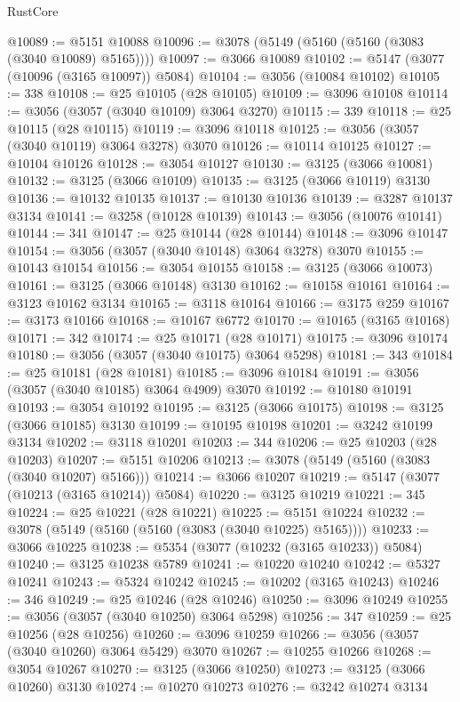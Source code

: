 \begin{lexlean}{RustCore}
\begin{coremodule}
@10089 := @5151 @10088
@10096 := @3078 (@5149 (@5160 (@5160 (@3083 (@3040 @10089) @5165))))
@10097 := @3066 @10089
@10102 := @5147 (@3077 (@10096 (@3165 @10097)) @5084)
@10104 := @3056 (@10084 @10102)
@10105 := 338
@10108 := @25 @10105 (@28 @10105)
@10109 := @3096 @10108
@10114 := @3056 (@3057 (@3040 @10109) @3064 @3270)
@10115 := 339
@10118 := @25 @10115 (@28 @10115)
@10119 := @3096 @10118
@10125 := @3056 (@3057 (@3040 @10119) @3064 @3278) @3070
@10126 := @10114 @10125
@10127 := @10104 @10126
@10128 := @3054 @10127
@10130 := @3125 (@3066 @10081)
@10132 := @3125 (@3066 @10109)
@10135 := @3125 (@3066 @10119) @3130
@10136 := @10132 @10135
@10137 := @10130 @10136
@10139 := @3287 @10137 @3134
@10141 := @3258 (@10128 @10139)
@10143 := @3056 (@10076 @10141)
@10144 := 341
@10147 := @25 @10144 (@28 @10144)
@10148 := @3096 @10147
@10154 := @3056 (@3057 (@3040 @10148) @3064 @3278) @3070
@10155 := @10143 @10154
@10156 := @3054 @10155
@10158 := @3125 (@3066 @10073)
@10161 := @3125 (@3066 @10148) @3130
@10162 := @10158 @10161
@10164 := @3123 @10162 @3134
@10165 := @3118 @10164
@10166 := @3175 @259
@10167 := @3173 @10166
@10168 := @10167 @6772
@10170 := @10165 (@3165 @10168)
@10171 := 342
@10174 := @25 @10171 (@28 @10171)
@10175 := @3096 @10174
@10180 := @3056 (@3057 (@3040 @10175) @3064 @5298)
@10181 := 343
@10184 := @25 @10181 (@28 @10181)
@10185 := @3096 @10184
@10191 := @3056 (@3057 (@3040 @10185) @3064 @4909) @3070
@10192 := @10180 @10191
@10193 := @3054 @10192
@10195 := @3125 (@3066 @10175)
@10198 := @3125 (@3066 @10185) @3130
@10199 := @10195 @10198
@10201 := @3242 @10199 @3134
@10202 := @3118 @10201
@10203 := 344
@10206 := @25 @10203 (@28 @10203)
@10207 := @5151 @10206
@10213 := @3078 (@5149 (@5160 (@3083 (@3040 @10207) @5166)))
@10214 := @3066 @10207
@10219 := @5147 (@3077 (@10213 (@3165 @10214)) @5084)
@10220 := @3125 @10219
@10221 := 345
@10224 := @25 @10221 (@28 @10221)
@10225 := @5151 @10224
@10232 := @3078 (@5149 (@5160 (@5160 (@3083 (@3040 @10225) @5165))))
@10233 := @3066 @10225
@10238 := @5354 (@3077 (@10232 (@3165 @10233)) @5084)
@10240 := @3125 @10238 @5789
@10241 := @10220 @10240
@10242 := @5327 @10241
@10243 := @5324 @10242
@10245 := @10202 (@3165 @10243)
@10246 := 346
@10249 := @25 @10246 (@28 @10246)
@10250 := @3096 @10249
@10255 := @3056 (@3057 (@3040 @10250) @3064 @5298)
@10256 := 347
@10259 := @25 @10256 (@28 @10256)
@10260 := @3096 @10259
@10266 := @3056 (@3057 (@3040 @10260) @3064 @5429) @3070
@10267 := @10255 @10266
@10268 := @3054 @10267
@10270 := @3125 (@3066 @10250)
@10273 := @3125 (@3066 @10260) @3130
@10274 := @10270 @10273
@10276 := @3242 @10274 @3134

\end{coremodule}
\end{lexlean}
